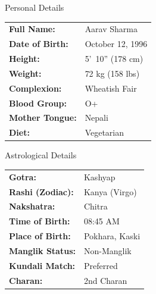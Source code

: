 \documentclass[11pt,a4paper]{article}
\begin{document}
\begin{minipage}[t]{0.48\textwidth}
  \vspace{0pt}
  \begin{sectionbox}{Personal Details}
    \begin{tabularx}{\textwidth}{@{}l X@{}}
      \textbf{Full Name:} & Aarav Sharma \\
      \textbf{Date of Birth:} & October 12, 1996 \\
      \textbf{Height:} & 5'\ 10'' (178 cm) \\
      \textbf{Weight:} & 72 kg (158 lbs) \\
      \textbf{Complexion:} & Wheatish Fair \\
      \textbf{Blood Group:} & O+ \\
      \textbf{Mother Tongue:} & Nepali \\
      \textbf{Diet:} & Vegetarian \\
    \end{tabularx}
  \end{sectionbox}
\end{minipage}%
\hfill
\begin{minipage}[t]{0.48\textwidth}
  \vspace{0pt}
  \begin{sectionbox}{Astrological Details}
    \begin{tabularx}{\textwidth}{@{}l X@{}}
      \textbf{Gotra:} & Kashyap \\
      \textbf{Rashi (Zodiac):} & Kanya (Virgo) \\
      \textbf{Nakshatra:} & Chitra \\
      \textbf{Time of Birth:} & 08:45 AM \\
      \textbf{Place of Birth:} & Pokhara, Kaski \\
      \textbf{Manglik Status:} & Non-Manglik \\
      \textbf{Kundali Match:} & Preferred \\
      \textbf{Charan:} & 2nd Charan \\
    \end{tabularx}
  \end{sectionbox}
\end{minipage}

\par\vspace{2.0em}
\end{document}
